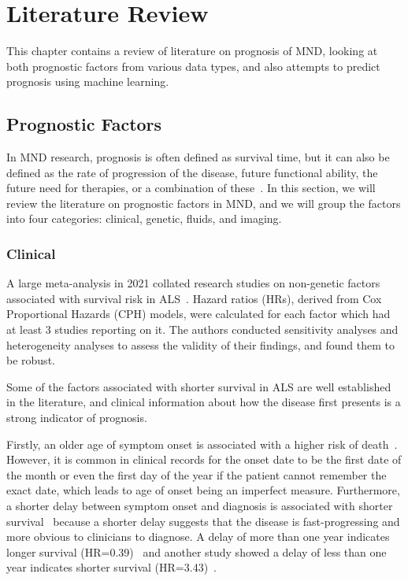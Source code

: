 \chapter{Literature Review}
\label{literature_review}

This chapter contains a review of literature on prognosis of MND, looking at both prognostic factors from various data types, and also attempts to predict prognosis using machine learning.

\section{Prognostic Factors}

In MND research, prognosis is often defined as survival time, but it can also be defined as the rate of progression of the disease, future functional ability, the future need for therapies, or a combination of these~\cite{papaizMachineLearningSolutions2022, tavazziArtificialIntelligenceStatistical2023}.
In this section, we will review the literature on prognostic factors in MND, and we will group the factors into four categories: clinical, genetic, fluids, and imaging.

\subsection{Clinical}

A large meta-analysis in 2021 collated research studies on non-genetic factors associated with survival risk in ALS~\cite{suPredictorsSurvivalPatients2021}.
Hazard ratios (HRs), derived from Cox Proportional Hazards (CPH) models, were calculated for each factor which had at least 3 studies reporting on it.
The authors conducted sensitivity analyses and heterogeneity analyses to assess the validity of their findings, and found them to be robust.

Some of the factors associated with shorter survival in ALS are well established in the literature, and clinical information about how the disease first presents is a strong indicator of prognosis.

Firstly, an older age of symptom onset is associated with a higher risk of death~\cite{suPredictorsSurvivalPatients2021}.
However, it is common in clinical records for the onset date to be the first date of the month or even the first day of the year if the patient cannot remember the exact date, which leads to age of onset being an imperfect measure.
Furthermore, a shorter delay between symptom onset and diagnosis is associated with shorter survival~\cite{suPredictorsSurvivalPatients2021} because a shorter delay suggests that the disease is fast-progressing and more obvious to clinicians to diagnose.
A delay of more than one year indicates longer survival (HR=0.39)~\cite{suPredictorsSurvivalPatients2021} and another study showed a delay of less than one year indicates shorter survival (HR=3.43)~\cite{gaoEpidemiologyFactorsPredicting2021}.

